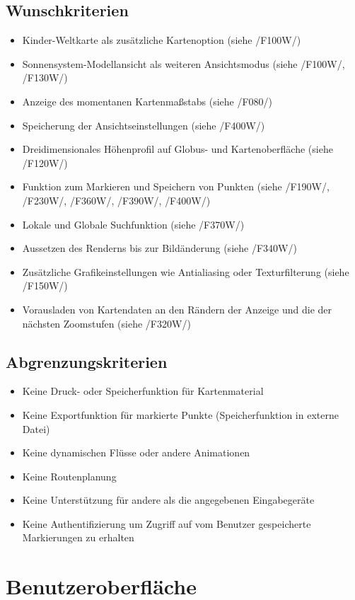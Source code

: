 \documentclass[10pt]{scrreprt}
\newcommand{\ziel}[1]{{\fontsize{9.5}{11}\textsf{/#1/}}}
\begin{document}
\section{Wunschkriterien}
\begin{itemize}
\item Kinder-Weltkarte als zusätzliche Kartenoption (siehe \ziel{F100W})
\item Sonnensystem-Modellansicht als weiteren Ansichtsmodus (siehe \ziel{F100W}, \ziel{F130W})
\item Anzeige des momentanen Kartenmaßstabs (siehe \ziel{F080})
\item Speicherung der Ansichtseinstellungen (siehe \ziel{F400W})
\item Dreidimensionales Höhenprofil auf Globus- und Kartenoberfläche (siehe \ziel{F120W})
\item Funktion zum Markieren und Speichern von Punkten (siehe \ziel{F190W}, \ziel{F230W}, \ziel{F360W}, \ziel{F390W}, \ziel{F400W})
\item Lokale und Globale Suchfunktion (siehe \ziel{F370W})
\item Aussetzen des Renderns bis zur Bildänderung (siehe \ziel{F340W})
\item Zusätzliche Grafikeinstellungen wie Antialiasing oder Texturfilterung (siehe \ziel{F150W})
\item Vorausladen von Kartendaten an den Rändern der Anzeige und die der nächsten Zoomstufen (siehe \ziel{F320W})
\end{itemize}

\section{Abgrenzungskriterien}
\begin{itemize}
\item Keine Druck- oder Speicherfunktion für Kartenmaterial
\item Keine Exportfunktion für markierte Punkte (Speicherfunktion in externe Datei)
\item Keine dynamischen Flüsse oder andere Animationen
\item Keine Routenplanung
\item Keine Unterstützung für andere als die angegebenen Eingabegeräte
\item Keine Authentifizierung um Zugriff auf vom Benutzer gespeicherte Markierungen zu erhalten
\end{itemize}


\chapter{Benutzeroberfläche}
\end{document}
